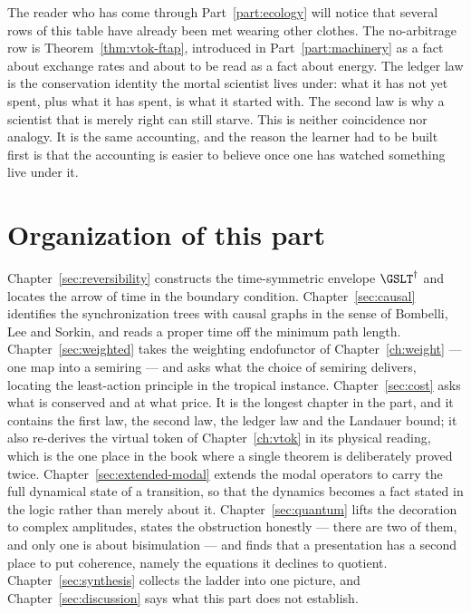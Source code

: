 The reader who has come through Part~\ref{part:ecology} will notice that
several rows of this table have already been met wearing other clothes.
The no-arbitrage row is Theorem~\ref{thm:vtok-ftap}, introduced in
Part~\ref{part:machinery} as a fact about exchange rates and about to be
read as a fact about energy.
The ledger law is the conservation identity the mortal scientist lives
under: what it has not yet spent, plus what it has spent, is what it
started with.
The second law is why a scientist that is merely right can still starve.
This is neither coincidence nor analogy.
It is the same accounting, and the reason the learner had to be built
first is that the accounting is easier to believe once one has watched
something live under it.

\section{Organization of this part}

Chapter~\ref{sec:reversibility} constructs the time-symmetric envelope
$\GSLT^\dagger$ and locates the arrow of time in the boundary condition.
Chapter~\ref{sec:causal} identifies the synchronization trees with causal
graphs in the sense of Bombelli, Lee and Sorkin, and reads a proper time
off the minimum path length.
Chapter~\ref{sec:weighted} takes the weighting endofunctor of
Chapter~\ref{ch:weight} --- one map into a semiring --- and asks what the
choice of semiring delivers, locating the least-action principle in the
tropical instance.
Chapter~\ref{sec:cost} asks what is conserved and at what price.
It is the longest chapter in the part, and it contains the first law, the
second law, the ledger law and the Landauer bound; it also re-derives the
virtual token of Chapter~\ref{ch:vtok} in its physical reading, which is
the one place in the book where a single theorem is deliberately proved
twice.
Chapter~\ref{sec:extended-modal} extends the modal operators to carry the
full dynamical state of a transition, so that the dynamics becomes a fact
stated in the logic rather than merely about it.
Chapter~\ref{sec:quantum} lifts the decoration to complex amplitudes,
states the obstruction honestly --- there are two of them, and only one is
about bisimulation --- and finds that a presentation has a second place to
put coherence, namely the equations it declines to quotient.
Chapter~\ref{sec:synthesis} collects the ladder into one picture, and
Chapter~\ref{sec:discussion} says what this part does not establish.

